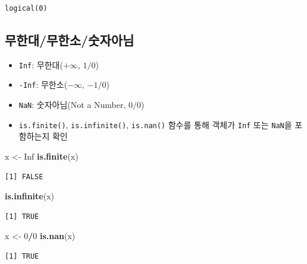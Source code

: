 \documentclass[
  11pt,
]{krantz}
\newenvironment{Shaded}{\begin{snugshade}}{\end{snugshade}}
\newcommand{\DecValTok}[1]{\textcolor[rgb]{0.06,0.06,0.06}{#1}}
\newcommand{\KeywordTok}[1]{\textcolor[rgb]{0.27,0.27,0.27}{\textbf{#1}}}
\newcommand{\NormalTok}[1]{#1}
\newcommand{\OperatorTok}[1]{\textcolor[rgb]{0.43,0.43,0.43}{\textbf{#1}}}
\newcommand{\OtherTok}[1]{\textcolor[rgb]{0.37,0.37,0.37}{#1}}
\newcommand{\StringTok}[1]{\textcolor[rgb]{0.5,0.5,0.5}{#1}}
\providecommand{\tightlist}{%
  \setlength{\itemsep}{0pt}\setlength{\parskip}{0pt}}
\begin{document}
\begin{verbatim}
logical(0)
\end{verbatim}

\normalsize

\hypertarget{finite}{%
\subsection{무한대/무한소/숫자아님}\label{finite}}

\begin{itemize}
\tightlist
\item
  \texttt{Inf}: 무한대(\(+\infty\), \(1/0\))
\item
  \texttt{-Inf}: 무한소(\(-\infty\), \(-1/0\))
\item
  \texttt{NaN}: 숫자아님(Not a Number, \(0/0\))
\item
  \texttt{is.finite()}, \texttt{is.infinite()}, \texttt{is.nan()} 함수를 통해 객체가 \texttt{Inf} 또는 \texttt{NaN}을 포함하는지 확인
\end{itemize}

\footnotesize

\begin{Shaded}
\begin{Highlighting}[]
\NormalTok{x <-}\StringTok{ }\OtherTok{Inf}
\KeywordTok{is.finite}\NormalTok{(x)}
\end{Highlighting}
\end{Shaded}

\begin{verbatim}
[1] FALSE
\end{verbatim}

\begin{Shaded}
\begin{Highlighting}[]
\KeywordTok{is.infinite}\NormalTok{(x)}
\end{Highlighting}
\end{Shaded}

\begin{verbatim}
[1] TRUE
\end{verbatim}

\begin{Shaded}
\begin{Highlighting}[]
\NormalTok{x <-}\StringTok{ }\DecValTok{0}\OperatorTok{/}\DecValTok{0}
\KeywordTok{is.nan}\NormalTok{(x)}
\end{Highlighting}
\end{Shaded}

\begin{verbatim}
[1] TRUE
\end{verbatim}
\end{document}
